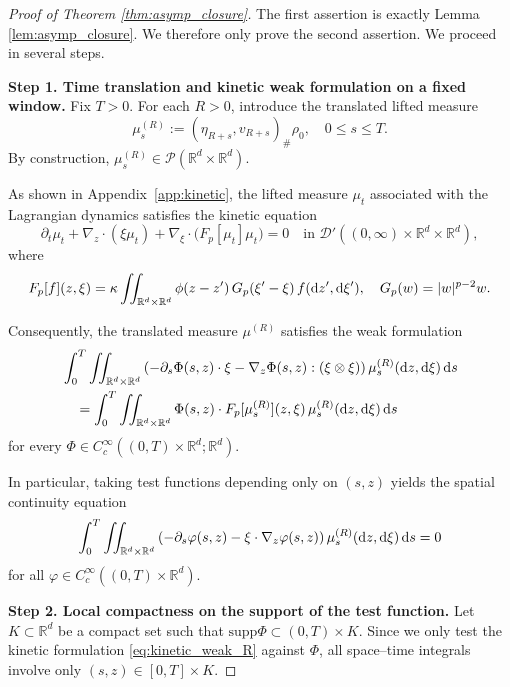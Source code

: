 \documentclass[10pt,reqno]{amsart}
\renewcommand{\le}{\leqslant}
\numberwithin{equation}{section}
\newcommand{\R}{\mathbb R}
\newcommand{\lt}{\left}
\newcommand{\rt}{\right}
\newcommand{\intrr}{\iint_{\R^d \times \R^d}}
\newcommand{\calD}{\mathcal D}
\newcommand{\calP}{\mathcal P}
\newcommand{\rd}{\textnormal{d}}
\newcommand{\supp}{\text{supp}}
\begin{document}
\begin{proof}[Proof of Theorem \ref{thm:asymp_closure}]
The first assertion is exactly Lemma \ref{lem:asymp_closure}. We therefore only prove the second assertion. We proceed in several steps.

\medskip
\noindent\textbf{Step 1. Time translation and kinetic weak formulation on a fixed window.}
Fix $T>0$. For each $R>0$, introduce the translated lifted measure
\[
\mu^{(R)}_s := (\eta_{R+s},v_{R+s})_\#\rho_0, \quad 0\le s\le T.
\]
By construction, $\mu^{(R)}_s\in\calP(\R^d\times\R^d)$.

As shown in Appendix~\ref{app:kinetic}, the lifted measure $\mu_t$ associated with the Lagrangian dynamics satisfies the kinetic equation
\[
\partial_t\mu_t +\nabla_z\cdot(\xi\mu_t) +\nabla_\xi\cdot\bigl(F_p[\mu_t]\mu_t\bigr)=0 \quad\text{in }\calD'((0,\infty)\times\R^d\times\R^d),
\]
where
\[
F_p[f](z,\xi) = \kappa \iint_{\R^d\times\R^d} \phi(z-z')\,G_p(\xi'-\xi)\,f(\rd z',\rd\xi'),
\quad
G_p(w)=|w|^{p-2}w.
\]

Consequently, the translated measure $\mu^{(R)}$ satisfies the weak formulation
\begin{align}\label{eq:kinetic_weak_R}
\begin{aligned}
&\int_0^T\intrr \lt(-\partial_s\Phi(s,z)\cdot\xi -\nabla_z\Phi(s,z):(\xi\otimes\xi)\rt) \mu^{(R)}_s(\rd z,\rd\xi) \,\rd s \\ 
&\quad = \int_0^T\intrr \Phi(s,z)\cdot F_p[\mu^{(R)}_s](z,\xi) \,\mu^{(R)}_s(\rd z,\rd\xi) \,\rd s
\end{aligned}
\end{align}
for every $\Phi\in C_c^\infty((0,T)\times\R^d;\R^d)$.

In particular, taking test functions depending only on $(s,z)$ yields the spatial continuity equation
\[%
\int_0^T\intrr
\lt(-\partial_s\varphi(s,z)-\xi\cdot\nabla_z\varphi(s,z)\rt)  \mu^{(R)}_s(\rd z,\rd\xi)\,\rd s=0
\]%
for all $\varphi\in C_c^\infty((0,T)\times\R^d)$.
 
\medskip
\noindent\textbf{Step 2. Local compactness on the support of the test function.}
Let $K\subset\R^d$ be a compact set such that $\supp\Phi\subset (0,T)\times K$. Since we only test the kinetic formulation \eqref{eq:kinetic_weak_R} against $\Phi$, all space--time integrals involve only $(s,z)\in[0,T]\times K$.


\end{proof}
\end{document}
